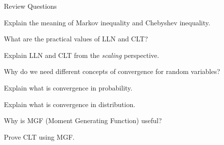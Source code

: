 \begin{frame}{Review Questions}

\bce[1)]

\item Explain the meaning of Markov inequality and Chebyshev
  inequality.
  
\item What are the practical values of LLN and CLT?

\item Explain LLN and CLT from the {\em scaling} perspective.

\item Why do we need different concepts of convergence for random variables?

\item Explain what is convergence in probability.

\item Explain what is convergence in distribution.

\item Why is MGF (Moment Generating Function) useful?

\item Prove CLT using MGF. 

\ece

\end{frame}


